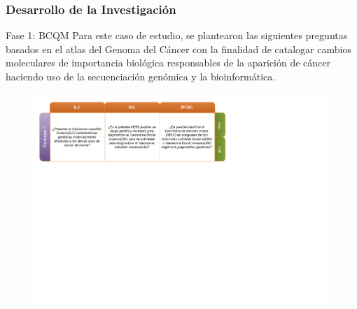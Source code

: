\documentclass[xcolor=dvipsnames,xcolor=table]{beamer} %
\begin{document}
\begin{frame}
	\frametitle{Desarrollo de la Investigación}
	\begin{block}{Fase 1: BCQM}\justifying
	Para este caso de estudio, se plantearon las siguientes preguntas  basados en el atlas del Genoma del Cáncer con la finalidad de catalogar cambios moleculares de importancia biológica responsables de la aparición de cáncer haciendo uso de la secuenciación genómica y la bioinformática.

	\end{block}
	
	\begin{figure}[h!]
		\centering
		\includegraphics[width=0.93\linewidth]{PROYECTO/imgs/BCQM_TCGA}
	\end{figure}
\end{frame}
\end{document}

